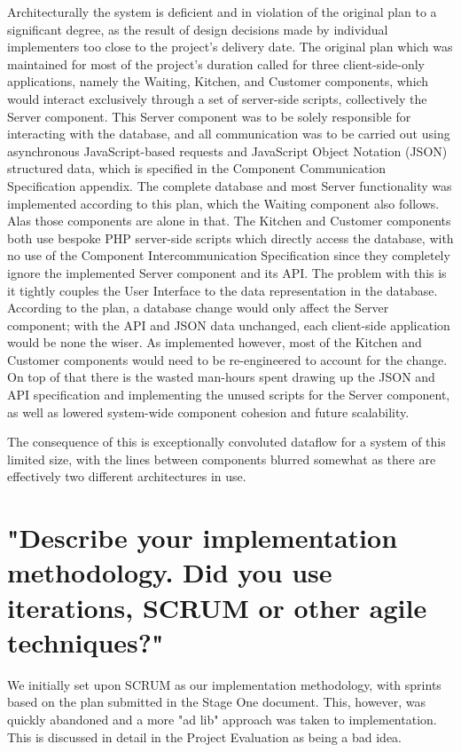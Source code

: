 \documentclass[11pt, oneside, a4paper]{report}   %
\begin{document}
Architecturally the system is deficient and in violation of the original plan to a significant degree, as the result of design decisions made by individual implementers too close to the project's delivery date. The original plan which was maintained for most of the project's duration called for three client-side-only applications, namely the Waiting, Kitchen, and Customer components, which would interact exclusively through a set of server-side scripts, collectively the Server component. This Server component was to be solely responsible for interacting with the database, and all communication was to be carried out using asynchronous JavaScript-based requests and JavaScript Object Notation (JSON) structured data, which is specified in the Component Communication Specification appendix. The complete database and most Server functionality was implemented according to this plan, which the Waiting component also follows. Alas those components are alone in that. The Kitchen and Customer components both use bespoke PHP server-side scripts which directly access the database, with no use of the Component Intercommunication Specification since they completely ignore the implemented Server component and its API. The problem with this is it tightly couples the User Interface to the data representation in the database. According to the plan, a database change would only affect the Server component; with the API and JSON data unchanged, each client-side application would be none the wiser. As implemented however, most of the Kitchen and Customer components would need to be re-engineered to account for the change. On top of that there is the wasted man-hours spent drawing up the JSON and API specification and implementing the unused scripts for the Server component, as well as lowered system-wide component cohesion and future scalability.

The consequence of this is exceptionally convoluted dataflow for a system of this limited size, with the lines between components blurred somewhat as there are effectively two different architectures in use. 

\section{"Describe your implementation methodology. Did you use iterations, SCRUM or other agile
techniques?"}
We initially set upon SCRUM as our implementation methodology, with sprints based on the plan submitted in the Stage One document. This, however, was quickly abandoned and a more "ad lib" approach was taken to implementation. This is discussed in detail in the Project Evaluation as being a bad idea.
\end{document}
